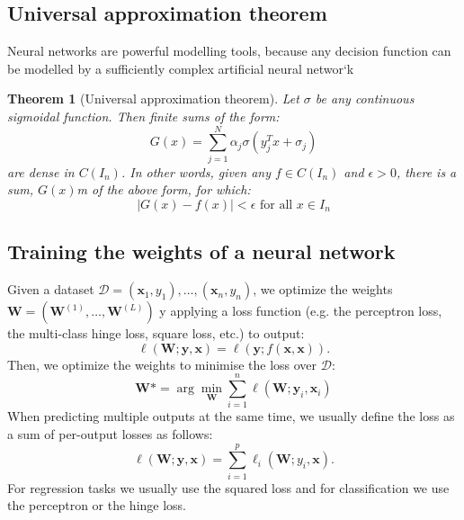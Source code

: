 \documentclass[a4paper,10pt,twoside]{article}
\newtheorem{theorem}{Theorem}
\begin{document}
\subsection{Universal approximation theorem}

Neural networks are powerful modelling tools, because any decision function can be modelled by a sufficiently complex artificial neural networ`k

\begin{theorem}[Universal approximation theorem]
    Let $\sigma$ be any continuous sigmoidal function. Then finite sums of the form:
    \begin{equation*}
        G(x)=\sum_{j=1}^{N}\alpha_j\sigma(y_j^Tx+\sigma_j)
    \end{equation*}
    are dense in $C(I_n)$. In other words, given any $f\in C(I_n)$ and $\epsilon>0$, there is a sum, $G(x)$m of the above form, for which:
    \begin{equation*}
        |G(x)-f(x)|<\epsilon\text{ for all }x\in I_n
    \end{equation*}
\end{theorem}

\subsection{Training the weights of a neural network}

Given a dataset $\mathcal{D} = {(\mathbf{x}_1,y_1),\ldots,(\mathbf{x}_n,y_n)}$, we optimize the weights $\mathbf{W}=(\mathbf{W}^{(1)}, \ldots, \mathbf{W}^{(L)})$ y applying a loss function (e.g. the perceptron loss, the multi-class hinge loss, square loss, etc.) to output:
\begin{equation*}\label{empiricalriskminimisation}
    \ell(\mathbf{W};\mathbf{y}, \mathbf{x})=\ell(\mathbf{y};f(\mathbf{x},\mathbf{x})).
\end{equation*} 
Then, we optimize the weights to minimise the loss over $\mathcal{D}$:
\begin{equation*}
    \mathbf{W}*=\arg\min_{\mathbf{W}}\sum_{i=1}^{n}\ell(\mathbf{W};\mathbf{y}_i,\mathbf{x}_i)
\end{equation*}
When predicting multiple outputs at the same time, we usually define the loss as a sum of per-output losses as follows:
\begin{equation*}
    \ell(\mathbf{W};\mathbf{y},\mathbf{x})=\sum_{i=1}^{p}\ell_i(\mathbf{W};y_i,\mathbf{x}).
\end{equation*}
For regression tasks we usually use the squared loss and for classification we use the perceptron or the hinge loss.
\end{document}

